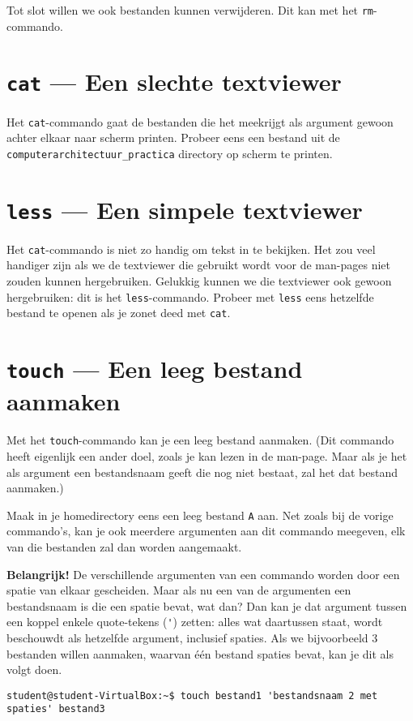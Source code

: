 \documentclass[a4paper,twoside,openany]{memoir}
\begin{document}
Tot slot willen we ook bestanden kunnen verwijderen. Dit kan met het
\verb!rm!-commando.

\section{\texttt{cat} --- Een slechte textviewer}
Het \verb!cat!-commando gaat de bestanden die het meekrijgt als argument gewoon achter elkaar naar scherm printen. Probeer eens een bestand uit de \verb!computerarchitectuur_practica! directory op scherm te printen.

\section{\texttt{less} --- Een simpele textviewer}
Het \verb!cat!-commando is niet zo handig om tekst in te bekijken. Het zou veel handiger zijn als we de textviewer die gebruikt wordt voor de man-pages niet zouden kunnen hergebruiken. Gelukkig kunnen we die textviewer ook gewoon hergebruiken: dit is het \verb!less!-commando. Probeer met \verb!less! eens hetzelfde bestand te openen als je zonet deed met \verb!cat!.

\section{\texttt{touch} --- Een leeg bestand aanmaken}

Met het \verb!touch!-commando kan je een leeg bestand aanmaken. (Dit commando heeft eigenlijk een ander doel, zoals je kan lezen in de man-page. Maar als je het als argument een bestandsnaam geeft die nog niet bestaat, zal het dat bestand aanmaken.)

Maak in je homedirectory eens een leeg bestand \verb!A! aan. Net zoals bij de vorige commando's, kan je ook meerdere argumenten aan dit commando meegeven, elk van die bestanden zal dan worden aangemaakt.

\textbf{Belangrijk!} De verschillende argumenten van een commando worden door een spatie van elkaar gescheiden. Maar als nu een van de argumenten een bestandsnaam is die een spatie bevat, wat dan? Dan kan je dat argument tussen een koppel enkele quote-tekens (\verb!'!) zetten: alles wat daartussen staat, wordt beschouwdt als hetzelfde argument, inclusief spaties. Als we bijvoorbeeld 3 bestanden willen aanmaken, waarvan \'e\'en bestand spaties bevat, kan je dit als volgt doen.

\begin{verbatim}
student@student-VirtualBox:~$ touch bestand1 'bestandsnaam 2 met spaties' bestand3
\end{verbatim}
\end{document}

